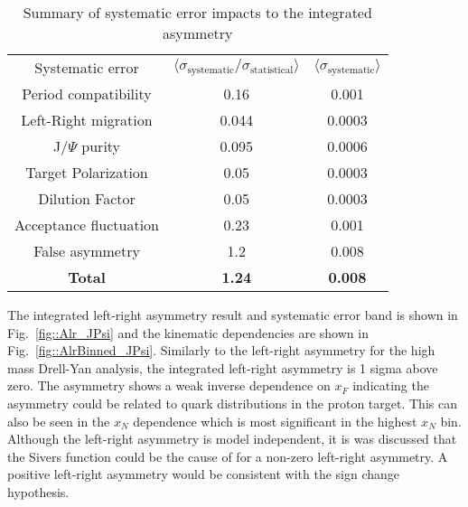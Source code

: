 \begin{table}[h!t]
  \centering
  \begin{tabular}{|c|c|c|}
    \hline
    \multirow{2}{*}{Systematic error}&
    \multirow{2}{*}{
      $\langle \sigma_{\mathrm{systematic}}/\sigma_{\mathrm{statistical}}
      \rangle$} &
    \multirow{2}{*}{$\langle \sigma_{\mathrm{systematic}} \rangle$}\\
    & & \\ \hline \hline

    Period compatibility& 0.16& 0.001\\ \hline

    Left-Right migration& 0.044& 0.0003\\ \hline

    J/$\Psi$ purity& 0.095& 0.0006\\ \hline

    Target Polarization& 0.05& 0.0003\\ \hline

    Dilution Factor& 0.05& 0.0003\\ \hline

    Acceptance fluctuation& 0.23 & 0.001\\ \hline

    False asymmetry& 1.2 & 0.008\\ \hline \hline
    \textbf{Total}& \textbf{1.24} & \textbf{0.008}\\\hline
    
  \end{tabular}
  \caption{Summary of systematic error impacts to the integrated asymmetry}
  \label{tab::sysErrorJPsi}
\end{table}

The integrated left-right asymmetry result and systematic error band is shown in
Fig.~\ref{fig::Alr_JPsi} and the kinematic dependencies are shown in
Fig.~\ref{fig::AlrBinned_JPsi}.  Similarly to the left-right asymmetry for the
high mass Drell-Yan analysis, the integrated left-right asymmetry is 1 sigma
above zero.  The asymmetry shows a weak inverse dependence on $x_F$ indicating
the asymmetry could be related to quark distributions in the proton target.
This can also be seen in the $x_N$ dependence which is most significant in the
highest $x_N$ bin.  Although the left-right asymmetry is model independent, it
is was discussed that the Sivers function could be the cause of for a non-zero
left-right asymmetry.  A positive left-right asymmetry would be consistent with
the sign change hypothesis.

